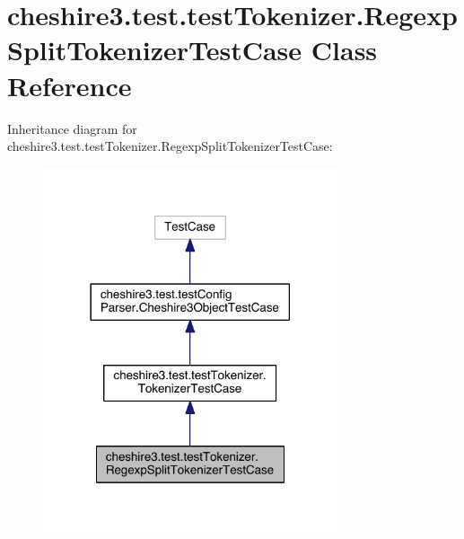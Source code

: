 \hypertarget{classcheshire3_1_1test_1_1test_tokenizer_1_1_regexp_split_tokenizer_test_case}{\section{cheshire3.\-test.\-test\-Tokenizer.\-Regexp\-Split\-Tokenizer\-Test\-Case Class Reference}
\label{classcheshire3_1_1test_1_1test_tokenizer_1_1_regexp_split_tokenizer_test_case}
}


Inheritance diagram for cheshire3.\-test.\-test\-Tokenizer.\-Regexp\-Split\-Tokenizer\-Test\-Case\-:
\nopagebreak
\begin{figure}[H]
\begin{center}
\leavevmode
\includegraphics[width=246pt]{classcheshire3_1_1test_1_1test_tokenizer_1_1_regexp_split_tokenizer_test_case__inherit__graph}
\end{center}
\end{figure}


